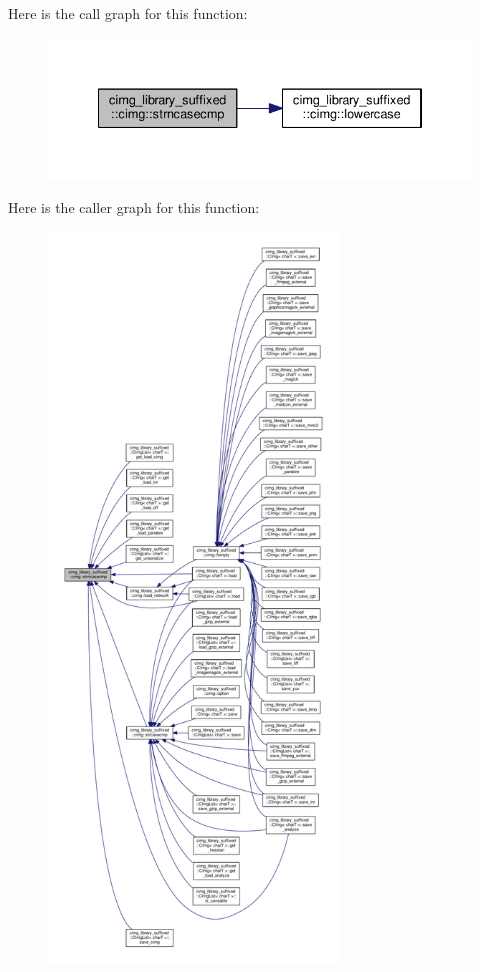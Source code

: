 Here is the call graph for this function\+:
\nopagebreak
\begin{figure}[H]
\begin{center}
\leavevmode
\includegraphics[width=334pt]{d4/d9b/namespacecimg__library__suffixed_1_1cimg_a1304046a29511fe0a015173e46607229_cgraph}
\end{center}
\end{figure}
Here is the caller graph for this function\+:
\nopagebreak
\begin{figure}[H]
\begin{center}
\leavevmode
\includegraphics[height=550pt]{d4/d9b/namespacecimg__library__suffixed_1_1cimg_a1304046a29511fe0a015173e46607229_icgraph}
\end{center}
\end{figure}
\mbox{\label{namespacecimg__library__suffixed_1_1cimg_a85cb703b948df7a021fd41ca3bad6696}} 

